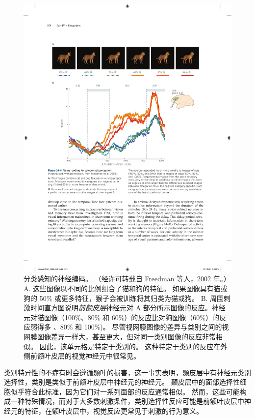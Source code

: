 \begin{figure}[htbp]
	\centering
	\includegraphics[width=0.9\linewidth]{chap24/fig_24_8}
	\caption{分类感知的神经编码。 （经许可转载自 Freedman 等人，2002 年。） A. 这些图像以不同的比例组合了猫和狗的特征。 如果图像具有猫或狗的 50\% 或更多特征，猴子会被训练将其归类为猫或狗。 B. 周围刺激时间直方图说明\textit{前额皮层}神经元对 A 部分所示图像的反应。神经元对猫图像（100\%、80\% 和 60\%）的反应比对狗图像（60\%）的反应弱得多 、80\% 和 100\%)。 尽管视网膜图像的差异与类别之间的视网膜图像差异一样大，甚至更大，但对同一类别图像的反应非常相似。 因此，该单元格是特定于类别的。 这种特定于类别的反应在外侧前额叶皮层的视觉神经元中很常见。}
	\label{fig:24_8}
\end{figure}


类别特异性的不症有时会遵循颞叶的损害，这一事实表明，颞皮层中有神经元类别选择性，类别是类似于前额叶皮层中神经元的神经元。
颞皮层中的面部选择性细胞似乎符合此标准，因为它们对一系列面部的反应通常相似。
然而，这些可能构成一种特殊情况，而对于大多数刺激条件，类别选择性反应可能是前额叶皮层中神经元的特征，在额叶皮层中，视觉反应更常见于刺激的行为意义。




